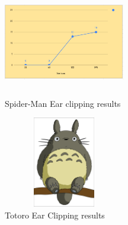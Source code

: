 \documentclass[conference]{IEEEtran}
\begin{document}
\begin{figure}[H]
    \centering
    \includegraphics[width=200,height=150,keepaspectratio]{SpiderMan}
    \caption{Spider-Man Ear clipping results}
    \label{fig:Result1}
    \centering
    \includegraphics[width=200,height=150,keepaspectratio]{totoro}
    \caption{Totoro Ear Clipping results}
\end{figure}
\end{document}
